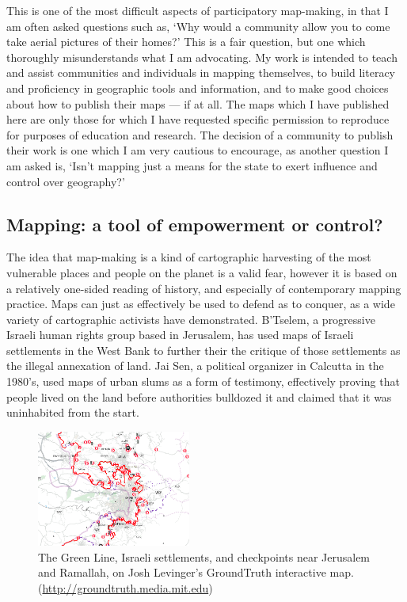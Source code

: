 \documentclass[11pt]{report}
\begin{document}
This is one of the most difficult aspects of participatory map-making, in that I am often asked questions such as, `Why would a community allow you to come take aerial pictures of their homes?' This is a fair question, but one which thoroughly misunderstands what I am advocating. My work is intended to teach and assist communities and individuals in mapping themselves, to build literacy and proficiency in geographic tools and information, and to make good choices about how to publish their maps --- if at all. The maps which I have published here are only those for which I have requested specific permission to reproduce for purposes of education and research. The decision of a community to publish their work is one which I am very cautious to encourage, as another question I am asked is, `Isn't mapping just a means for the state to exert influence and control over geography?' 

\subsection{Mapping: a tool of empowerment or control?}

The idea that map-making is a kind of cartographic harvesting of the most vulnerable places and people on the planet is a valid fear, however it is based on a relatively one-sided reading of history, and especially of contemporary mapping practice. Maps can just as effectively be used to defend as to conquer, as a wide variety of cartographic activists have demonstrated. B'Tselem, a progressive Israeli human rights group based in Jerusalem, has used maps of Israeli settlements in the West Bank to further their the critique of those settlements as the illegal annexation of land. Jai Sen, a political organizer in Calcutta in the 1980's, used maps of urban slums as a form of testimony, effectively proving that people lived on the land before authorities bulldozed it and claimed that it was uninhabited from the start. 

\begin{figure}
	\begin{flushright}
		\includegraphics[width=0.45\textwidth]{images/levinger-groundtruth.png}
		\caption{The Green Line, Israeli settlements, and checkpoints near Jerusalem and Ramallah, on Josh Levinger's GroundTruth interactive map. (\url{http://groundtruth.media.mit.edu})}
	\end{flushright}
\end{figure}
\end{document}

